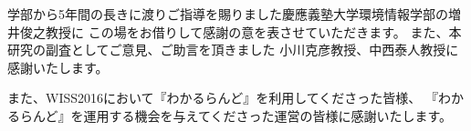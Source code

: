 \begin{acknowledgment}

学部から5年間の長きに渡りご指導を賜りました慶應義塾大学環境情報学部の増井俊之教授に
この場をお借りして感謝の意を表させていただきます。
また、本研究の副査としてご意見、ご助言を頂きました
小川克彦教授、中西泰人教授に感謝いたします。

また、WISS2016において『わかるらんど』を利用してくださった皆様、
『わかるらんど』を運用する機会を与えてくださった運営の皆様に感謝いたします。

\end{acknowledgment}
